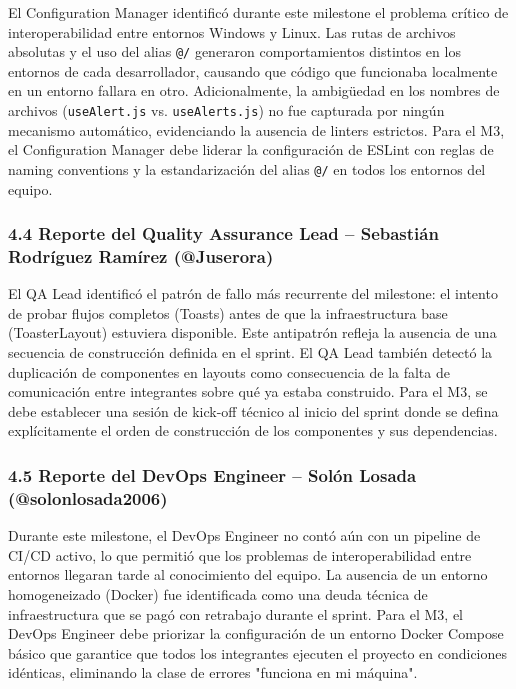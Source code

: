 \documentclass[11pt,a4paper]{article}
\begin{document}
El Configuration Manager identificó durante este milestone el problema crítico de interoperabilidad entre entornos Windows y Linux. Las rutas de archivos absolutas y el uso del alias \texttt{@/} generaron comportamientos distintos en los entornos de cada desarrollador, causando que código que funcionaba localmente en un entorno fallara en otro. Adicionalmente, la ambigüedad en los nombres de archivos (\texttt{useAlert.js} vs. \texttt{useAlerts.js}) no fue capturada por ningún mecanismo automático, evidenciando la ausencia de linters estrictos. Para el M3, el Configuration Manager debe liderar la configuración de ESLint con reglas de naming conventions y la estandarización del alias \texttt{@/} en todos los entornos del equipo.

\subsubsection{4.4 Reporte del Quality Assurance Lead -- Sebastián Rodríguez Ramírez (@Juserora)}

El QA Lead identificó el patrón de fallo más recurrente del milestone: el intento de probar flujos completos (Toasts) antes de que la infraestructura base (ToasterLayout) estuviera disponible. Este antipatrón refleja la ausencia de una secuencia de construcción definida en el sprint. El QA Lead también detectó la duplicación de componentes en layouts como consecuencia de la falta de comunicación entre integrantes sobre qué ya estaba construido. Para el M3, se debe establecer una sesión de kick-off técnico al inicio del sprint donde se defina explícitamente el orden de construcción de los componentes y sus dependencias.

\subsubsection{4.5 Reporte del DevOps Engineer -- Solón Losada (@solonlosada2006)}

Durante este milestone, el DevOps Engineer no contó aún con un pipeline de CI/CD activo, lo que permitió que los problemas de interoperabilidad entre entornos llegaran tarde al conocimiento del equipo. La ausencia de un entorno homogeneizado (Docker) fue identificada como una deuda técnica de infraestructura que se pagó con retrabajo durante el sprint. Para el M3, el DevOps Engineer debe priorizar la configuración de un entorno Docker Compose básico que garantice que todos los integrantes ejecuten el proyecto en condiciones idénticas, eliminando la clase de errores "funciona en mi máquina".
\end{document}
